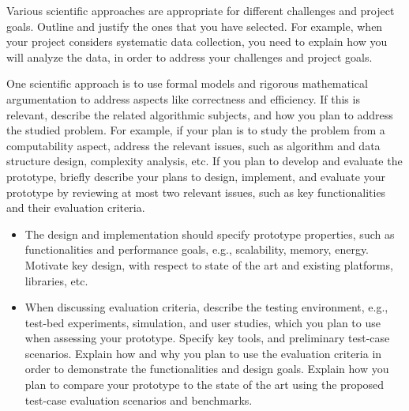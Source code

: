 Various scientific approaches are appropriate for different challenges and project goals.
Outline and justify the ones that you have selected.
For example, when your project considers systematic data collection, you need to explain how you will analyze the data, in order to address your challenges and project goals.

One scientific approach is to use formal models and rigorous mathematical argumentation to address aspects like correctness and efficiency.
If this is relevant, describe the related algorithmic subjects, and how you plan to address the studied problem.
For example, if your plan is to study the problem from a computability aspect, address the relevant issues, such as algorithm and data structure design, complexity analysis, etc.
If you plan to develop and evaluate the prototype, briefly describe your plans to design, implement, and evaluate your prototype by reviewing at most two relevant issues, such as key functionalities and their evaluation criteria.

\begin{itemize}
  \item The design and implementation should specify prototype properties, such as functionalities and performance goals, e.g., scalability, memory, energy.
    Motivate key design, with respect to state of the art and existing platforms, libraries, etc.
  \item When discussing evaluation criteria, describe the testing environment, e.g., test-bed experiments, simulation, and user studies, which you plan to use when assessing your prototype.
    Specify key tools, and preliminary test-case scenarios.
    Explain how and why you plan to use the evaluation criteria in order to demonstrate the functionalities and design goals.
    Explain how you plan to compare your prototype to the state of the art using the proposed test-case evaluation scenarios and benchmarks.
\end{itemize}
